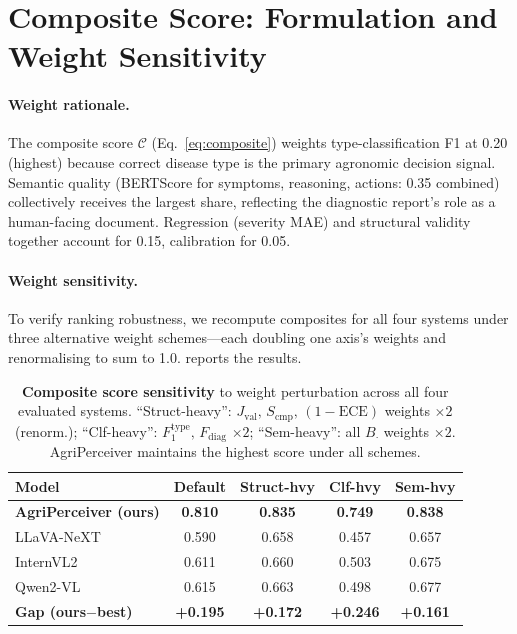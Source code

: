 \documentclass{article}
\newcommand{\ours}{AgriPerceiver}
\begin{document}
\section{Composite Score: Formulation and Weight Sensitivity}
\label{app:composite}

\paragraph{Weight rationale.}
The composite score $\mathcal{C}$ (Eq.~\ref{eq:composite}) weights
type-classification F1 at 0.20 (highest) because correct disease type
is the primary agronomic decision signal.
Semantic quality (BERTScore for symptoms, reasoning, actions: 0.35
combined) collectively receives the largest share, reflecting the
diagnostic report's role as a human-facing document.
Regression (severity MAE) and structural validity together account for
0.15, calibration for 0.05.

\paragraph{Weight sensitivity.}
To verify ranking robustness, we recompute composites for all four systems
under three alternative weight schemes---each doubling one axis's weights
and renormalising to sum to 1.0.
 reports the results.

\begin{table}[h]
  \centering
  \caption{\textbf{Composite score sensitivity} to weight perturbation
    across all four evaluated systems.
    ``Struct-heavy'': $J_{\text{val}},\,S_{\text{cmp}},\,(1{-}\mathrm{ECE})$
    weights ${\times}2$ (renorm.); ``Clf-heavy'': $F_1^{\text{type}},\,
    F_{\text{diag}}$ ${\times}2$; ``Sem-heavy'': all $B_\cdot$ weights
    ${\times}2$. \ours{} maintains the highest score under all schemes.}
  \label{tab:sensitivity}
  \footnotesize
  \setlength{\tabcolsep}{4pt}
  \begin{tabular}{@{}lcccc@{}}
    \toprule
    \textbf{Model} & \textbf{Default} & \textbf{Struct-hvy} & \textbf{Clf-hvy} & \textbf{Sem-hvy} \\
    \midrule
    \textbf{\ours{} (ours)} & \textbf{0.810} & \textbf{0.835} & \textbf{0.749} & \textbf{0.838} \\
    LLaVA-NeXT          & 0.590 & 0.658 & 0.457 & 0.657 \\
    InternVL2           & 0.611 & 0.660 & 0.503 & 0.675 \\
    Qwen2-VL            & 0.615 & 0.663 & 0.498 & 0.677 \\
    \midrule
    \textbf{Gap (ours$-$best)} & \textbf{+0.195} & \textbf{+0.172} & \textbf{+0.246} & \textbf{+0.161} \\
    \bottomrule
  \end{tabular}
\end{table}
\end{document}
